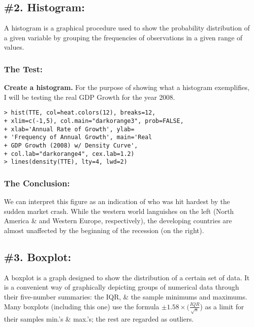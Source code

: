\documentclass[12pt,a4paper]{article}
\begin{document}
\subsection*{\pageref{label:BTP} \#2. Histogram:}
A histogram is a graphical procedure used to show the probability distribution of a given variable by grouping the frequencies of observations in a given range of values.
\subsubsection*{The Test:}
\textbf{Create a histogram.} For the purpose of showing what a histogram exemplifies, I will be testing the real GDP Growth for the year 2008.
\begin{shaded}
\begin{framed}
\footnotesize{\color{BrickRed}
\begin{verbatim}
> hist(TTE, col=heat.colors(12), breaks=12,
+ xlim=c(-1,5), col.main="darkorange3", prob=FALSE,
+ xlab='Annual Rate of Growth', ylab=
+ 'Frequency of Annual Growth', main='Real
+ GDP Growth (2008) w/ Density Curve',
+ col.lab="darkorange4", cex.lab=1.2)
> lines(density(TTE), lty=4, lwd=2)
\end{verbatim}}
\end{framed}
\end{shaded}
\newpage
%
\subsubsection*{The Conclusion:}
We can interpret this figure as an indication of who was hit hardest by the sudden market crash. While the western world languishes on the left (North America \& and Western Europe, respectively), the developing countries are almost unaffected by the beginning of the recession (on the right).
\newpage
\subsection*{\pageref{label:BTP} \#3. Boxplot:}
A boxplot is a graph designed to show the distribution of a certain set of data. It is a convenient way of graphically depicting groups of numerical data through their five-number summaries: the IQR, \& the sample minimums and maximums. Many boxplots (including this one) use the formula {$\pm 1.58\times(\frac{IQR}{\sqrt{n}}$)} as a limit for their samples min.'s \& max.'s; the rest are regarded as outliers.
\end{document}
